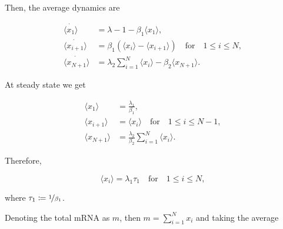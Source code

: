 Then, the average dynamics are

\begin{equation}
  \begin{split}
    \dot{\langle x_1\rangle} &= \lambda-1 -\beta_1\langle x_1\rangle,\\
    \dot{\langle x_{i+1}\rangle} &= \beta_1\left(\langle x_i\rangle - \langle x_{i+1}\rangle\right)\quad\text{for}\quad 1\leq i\leq N,\\
    \dot{\langle x_{N+1}\rangle} &= \lambda_2\sum_{i=1}^N\langle x_i\rangle-\beta_2\langle x_{N+1}\rangle.
  \end{split}
\end{equation}

At steady state we get

\begin{equation}
  \begin{split}
    \langle x_1\rangle &= \frac{\lambda_1}{\beta_1},\\
    \langle x_{i+1}\rangle &= \langle x_i\rangle\quad\text{for}\quad 1\leq i\leq N-1,\\
    \langle x_{N+1}\rangle &= \frac{\lambda_2}{\beta_2}\sum_{i=1}^N\langle x_i\rangle.
  \end{split}
\end{equation}

Therefore,

\begin{equation}
  \langle x_i\rangle = \lambda_1\tau_1\quad\text{for}\quad 1\leq i\leq N,
\end{equation}

where $\tau_1 \coloneqq \nicefrac{1}{\beta_1}$.

Denoting the total mRNA as $m$, then $m=\sum_{i=1}^Nx_i$ and taking the average

